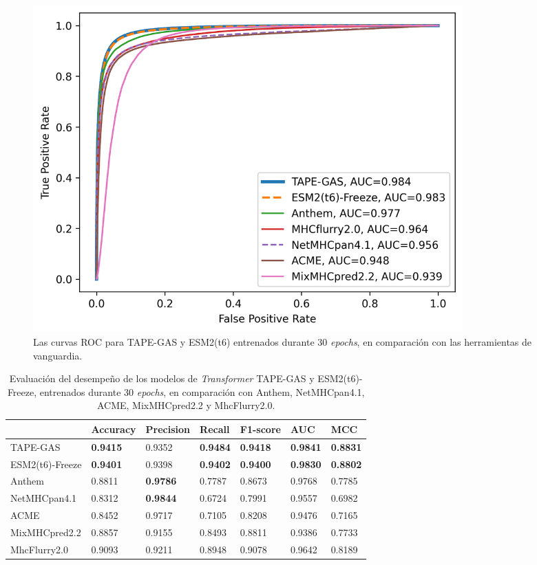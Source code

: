 \begin{figure}
	\centering
	\includegraphics[width=0.8\textwidth]{img/results/ROC_comparison}
	\caption[Comparación de ROC con métodos del estado del arte]{Las curvas ROC para TAPE-GAS y ESM2(t6) entrenados durante 30 \textit{epochs}, en comparación con las herramientas de vanguardia.}
	\label{fig:ROC_comparison_final}
\end{figure}

\begin{table}[]
	\centering
	\caption{Evaluación del desempeño de los modelos de \textit{Transformer} TAPE-GAS y ESM2(t6)-Freeze, entrenados durante 30 \textit{epochs}, en comparación con Anthem, NetMHCpan4.1, ACME, MixMHCpred2.2 y MhcFlurry2.0.}
	\label{tab:final_comparison}
	\footnotesize
	\setlength{\tabcolsep}{0.5em} %
	{\renewcommand{\arraystretch}{1.5}%
	\begin{tabular}{lllllll}
		& \textbf{Accuracy} & \textbf{Precision} & \textbf{Recall} & \textbf{F1-score} & \textbf{AUC}    & \textbf{MCC}    \\ \midrule
		TAPE-GAS        & \textbf{0.9415}   & 0.9352             & \textbf{0.9484} & \textbf{0.9418}   & \textbf{0.9841} & \textbf{0.8831} \\
		ESM2(t6)-Freeze & \textbf{0.9401}   & 0.9398             & \textbf{0.9402} & \textbf{0.9400}   & \textbf{0.9830} & \textbf{0.8802} \\
		
		Anthem          & 0.8811            & \textbf{0.9786}    & 0.7787          & 0.8673            & 0.9768          & 0.7785          \\
		NetMHCpan4.1    & 0.8312            & \textbf{0.9844}    & 0.6724          & 0.7991            & 0.9557          & 0.6982          \\
		
		ACME            & 0.8452            & 0.9717             & 0.7105          & 0.8208            & 0.9476          & 0.7165          \\
		MixMHCpred2.2   & 0.8857            & 0.9155             & 0.8493          & 0.8811            & 0.9386          & 0.7733          \\
		MhcFlurry2.0    & 0.9093            & 0.9211             & 0.8948          & 0.9078            & 0.9642          & 0.8189 \\         
	\end{tabular}}
\end{table}

